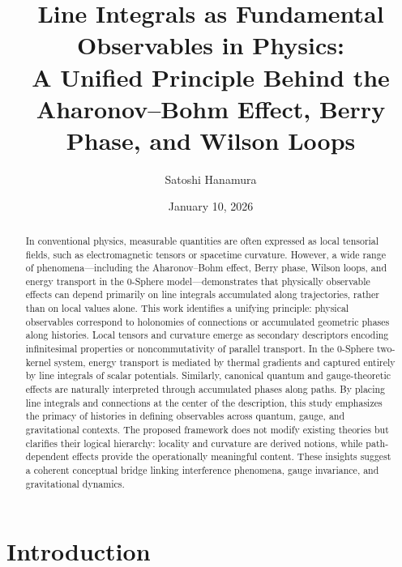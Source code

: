 \documentclass[%
 reprint,
 amsmath,amssymb,
 aps,
 prb,
]{revtex4-2}
\numberwithin{equation}{section}
\begin{document}
\title{Line Integrals as Fundamental Observables in Physics:\\ A Unified Principle Behind the Aharonov–Bohm Effect, Berry Phase, and Wilson Loops}

\author{Satoshi Hanamura}
\date{January 10, 2026}

\begin{abstract}
In conventional physics, measurable quantities are often expressed as local tensorial fields, such as electromagnetic tensors or spacetime curvature. However, a wide range of phenomena—including the Aharonov–Bohm effect, Berry phase, Wilson loops, and energy transport in the 0-Sphere model—demonstrates that physically observable effects can depend primarily on line integrals accumulated along trajectories, rather than on local values alone.
This work identifies a unifying principle: physical observables correspond to holonomies of connections or accumulated geometric phases along histories. Local tensors and curvature emerge as secondary descriptors encoding infinitesimal properties or noncommutativity of parallel transport. In the 0-Sphere two-kernel system, energy transport is mediated by thermal gradients and captured entirely by line integrals of scalar potentials. Similarly, canonical quantum and gauge-theoretic effects are naturally interpreted through accumulated phases along paths.
By placing line integrals and connections at the center of the description, this study emphasizes the primacy of histories in defining observables across quantum, gauge, and gravitational contexts. The proposed framework does not modify existing theories but clarifies their logical hierarchy: locality and curvature are derived notions, while path-dependent effects provide the operationally meaningful content. These insights suggest a coherent conceptual bridge linking interference phenomena, gauge invariance, and gravitational dynamics.
\end{abstract}


\maketitle


\section{Introduction}
\label{sec:introduction}
\end{document}
